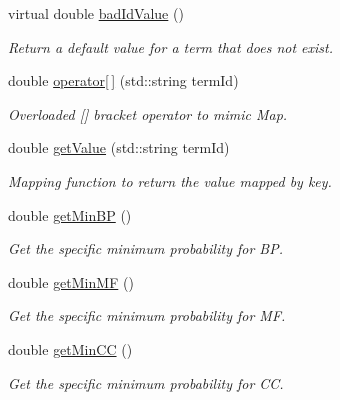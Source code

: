 \begin{DoxyCompactItemize}
virtual double \hyperlink{classTermProbabilityMap_adfeb9edb261c639cceae797cceb88d35}{bad\+Id\+Value} ()
\begin{DoxyCompactList}\small\item\em Return a default value for a term that does not exist. \end{DoxyCompactList}\item 
double \hyperlink{classTermProbabilityMap_acd472ef3c011377e6b9bdb01a60e84e1}{operator\mbox{[}$\,$\mbox{]}} (std\+::string term\+Id)
\begin{DoxyCompactList}\small\item\em Overloaded \mbox{[}\mbox{]} bracket operator to mimic Map. \end{DoxyCompactList}\item 
double \hyperlink{classTermProbabilityMap_a4ef29e6a25cb1b781c5a0b05b9b82ebf}{get\+Value} (std\+::string term\+Id)
\begin{DoxyCompactList}\small\item\em Mapping function to return the value mapped by key. \end{DoxyCompactList}\item 
double \hyperlink{classTermProbabilityMap_aa0cbaada30cf4fe8f7bf55acdfcbe7aa}{get\+Min\+BP} ()
\begin{DoxyCompactList}\small\item\em Get the specific minimum probability for BP. \end{DoxyCompactList}\item 
double \hyperlink{classTermProbabilityMap_af23163c0122e7745b6581eda91a72809}{get\+Min\+MF} ()
\begin{DoxyCompactList}\small\item\em Get the specific minimum probability for MF. \end{DoxyCompactList}\item 
double \hyperlink{classTermProbabilityMap_aa74c8e413fa1cce4d6528ccfad32efad}{get\+Min\+CC} ()
\begin{DoxyCompactList}\small\item\em Get the specific minimum probability for CC. \end{DoxyCompactList}\end{DoxyCompactItemize}
